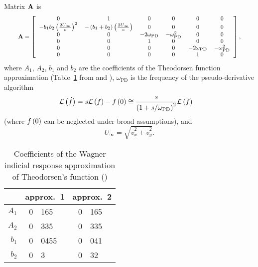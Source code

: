 Matrix $\bm{\mathbf{A}}$ is
\begin{equation}
	\footnotesize
	\bm{\mathbf{A}} = \left[
		\begin{array}{cccccc}
		0 & 1 & 0 & 0 & 0 & 0\\
		-b_1 b_2 \left(  \frac{2U_\infty}{c} \right)^2 & -\left(  b_1 + b_2 \right) \left( \frac{2 U_\infty}{c} \right)&
 		0 & 0 & 0 & 0 \\
		0 & 0 & -2\omega_\text{PD} & -\omega_\text{PD}^2 & 0 & 0\\
		0 & 0 & 1 & 0 & 0 & 0\\
		0 & 0 & 0 & 0 &-2\omega_\text{PD} & -\omega_\text{PD}^2 \\
		0 & 0 & 0 & 0 & 1 & 0
		\end{array}
		\right],
\end{equation}
where $A_1$, $A_2$, $b_1$ and $b_2$ are the coefficients of the Theodorsen
function approximation (Table~\ref{tab:aero:unsteady:theodorsen-coeffs}
from \cite{BIELAWA92} and \cite{LEISHMAN-2006}),
$\omega_\text{PD}$ is the frequency of the pseudo-derivative algorithm
\begin{align}
	\mathcal{L}\left( \dot{f} \right)
	&= s \mathcal{L}\left( f \right) - f\left( 0 \right)
	\cong \frac{s}{\left( 1 + s/\omega_\text{PD} \right)^2} \mathcal{L}\left( f \right)
\end{align}
(where $f\left( 0 \right)$ can be neglected under broad assumptions),
and
\begin{equation}
U_\infty = \sqrt{ \tilde{v}_x^2 +\tilde{v}_y^2}.
\end{equation}

\begin{table}
\centering
\caption{Coefficients of the Wagner indicial response approximation
of Theodorsen's function (\cite{BIELAWA92,LEISHMAN-2006})}
\label{tab:aero:unsteady:theodorsen-coeffs}
\begin{tabular}{r|r@{.}lr@{.}l}
& \multicolumn{2}{c}{approx.~1} & \multicolumn{2}{c}{approx.~2} \\
\hline
$A_1$ 	& 0&165		& 0&165 \\
$A_2$ 	& 0&335		& 0&335 \\
$b_1$ 	& 0&0455	& 0&041 \\
$b_2$	& 0&3		& 0&32
\end{tabular}
\end{table}

